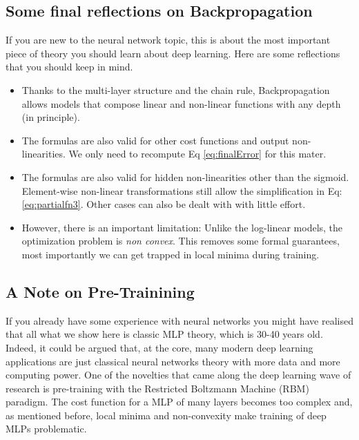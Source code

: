 \subsection{Some final reflections on Backpropagation}

If you are new to the neural network topic, this is about the most important piece of theory you should learn about deep learning. Here are some reflections that you should keep in mind.

\begin{itemize}
\item Thanks to the multi-layer structure and the chain rule, Backpropagation allows models that compose linear and non-linear functions with any depth (in principle\footnotemark). 
\item The formulas are also valid for other cost functions and output non-linearities. We only need to recompute Eq \ref{eq:finalError} for this mater.  
\item The formulas are also valid for hidden non-linearities other than the sigmoid. Element-wise non-linear transformations still allow the simplification in Eq: \ref{eq:partialfn3}. Other cases can also be dealt with with little effort.
\item However, there is an important limitation: Unlike the log-linear models, the optimization problem is \textit{non convex}. This removes some formal guarantees, most importantly we can get trapped in local minima during training.
\end{itemize}


\subsection{A Note on Pre-Trainining}

If you already have some experience with neural networks you might have realised that all what we show here is classic MLP theory, which is 30-40 years old. Indeed, it could be argued that, at the core, many modern deep learning applications are just classical neural networks theory with more data and more computing power. One of the novelties that came along the deep learning wave of research is pre-training with the Restricted Boltzmann Machine (RBM) paradigm. The cost function for a MLP of many layers becomes too complex and, as mentioned before, local minima and non-convexity make training of deep MLPs problematic. 

